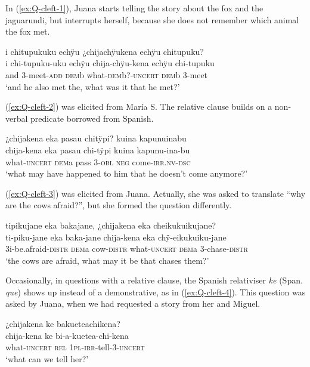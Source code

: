 In (\ref{ex:Q-cleft-1}), Juana starts telling the story about the fox and the jaguarundi, but interrupts herself, because she does not remember which animal the fox met.

\ea\label{ex:Q-cleft-1}
\begingl
\glpreamble i chitupukuku echÿu ¿chijachÿukena echÿu chitupuku?\\
\gla i chi-tupuku-uku echÿu chija-chÿu-kena echÿu chi-tupuku\\
\glb and 3-meet-\textsc{add} \textsc{dem}b what-\textsc{dem}b?-\textsc{uncert} \textsc{dem}b 3-meet\\
\glft ‘and he also met the, what was it that he met?’
\endgl
\trailingcitation{[jmx-n120429ls-x5.301-302]}
\xe

(\ref{ex:Q-cleft-2}) was elicited from María S. The relative clause builds on a non-verbal predicate borrowed from Spanish.

\ea\label{ex:Q-cleft-2}
\begingl
\glpreamble ¿chijakena eka pasau chitÿpi? kuina kapunuinabu \\
\gla chija-kena eka pasau chi-tÿpi kuina kapunu-ina-bu\\
\glb what-\textsc{uncert} \textsc{dem}a pass 3-\textsc{obl} \textsc{neg} come-\textsc{irr.nv}-\textsc{dsc}\\
\glft ‘what may have happened to him that he doesn’t come anymore?’
\endgl
\trailingcitation{[rxx-e181022le]}
\xe

(\ref{ex:Q-cleft-3}) was elicited from Juana. Actually, she was asked to translate “why are the cows afraid?”, but she formed the question differently.

\ea\label{ex:Q-cleft-3}
\begingl
\glpreamble tipikujane eka bakajane, ¿chijakena eka cheikukuikujane?\\
\gla ti-piku-jane eka baka-jane chija-kena eka chÿ-eikukuiku-jane\\
\glb 3i-be.afraid-\textsc{distr} \textsc{dem}a cow-\textsc{distr} what-\textsc{uncert} \textsc{dem}a 3-chase-\textsc{distr}\\
\glft ‘the cows are afraid, what may it be that chases them?’
\endgl
\trailingcitation{[jxx-a110923l.18]}
\xe

Occasionally, in questions with a relative clause, the Spanish relativiser \textit{ke} (Span. \textit{que}) shows up instead of a demonstrative, as in (\ref{ex:Q-cleft-4}). This question was asked by Juana, when we had requested a story from her and Miguel.

\ea\label{ex:Q-cleft-4}
\begingl
\glpreamble ¿chijakena ke bakueteachikena?\\
\gla chija-kena ke bi-a-kuetea-chi-kena\\
\glb what-\textsc{uncert} \textsc{rel} 1\textsc{pl}-\textsc{irr}-tell-3-\textsc{uncert}\\
\glft ‘what can we tell her?’
\endgl
\trailingcitation{[jmx-n120429ls-x5.046]}
\xe
{}

